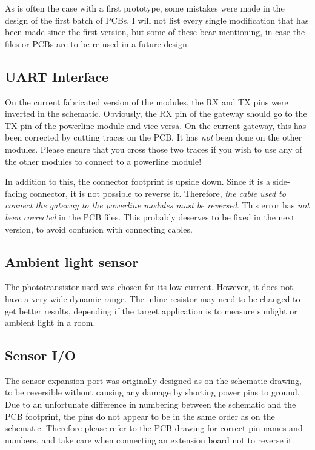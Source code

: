 As is often the case with a first prototype, some mistakes were made in the
design of the first batch of PCBs. I will not list every single modification
that has been made since the first version, but some of these bear mentioning,
in case the files or PCBs are to be re-used in a future design.

\subsection{UART Interface}
On the current fabricated version of the modules, the RX and TX pins were
inverted in the schematic. Obviously, the RX pin of the gateway should go to the
TX pin of the powerline module and vice versa. On the current gateway, this has
been corrected by cutting traces on the PCB. It has \emph{not} been done on the
other modules. Please ensure that you cross those two traces if you wish to use
any of the other modules to connect to a powerline module!

In addition to this, the connector footprint is upside down. Since it is a
side-facing connector, it is not possible to reverse it. Therefore, \emph{the
cable used to connect the gateway to the powerline modules must be reversed}.
This error has \emph{not been corrected} in the PCB files. This probably
deserves to be fixed in the next version, to avoid confusion with connecting
cables.

\subsection{Ambient light sensor}
The phototransistor used was chosen for its low current. However, it does not
have a very wide dynamic range. The inline resistor may need to be changed to
get better results, depending if the target application is to measure sunlight
or ambient light in a room.

\subsection{Sensor I/O}
The sensor expansion port was originally designed as on the schematic drawing,
to be reversible without causing any damage by shorting power pins to ground.
Due to an unfortunate difference in numbering between the schematic and the PCB
footprint, the pins do not appear to be in the same order as on the schematic.
Therefore please refer to the PCB drawing for correct pin names and numbers, and
take care when connecting an extension board not to reverse it.

